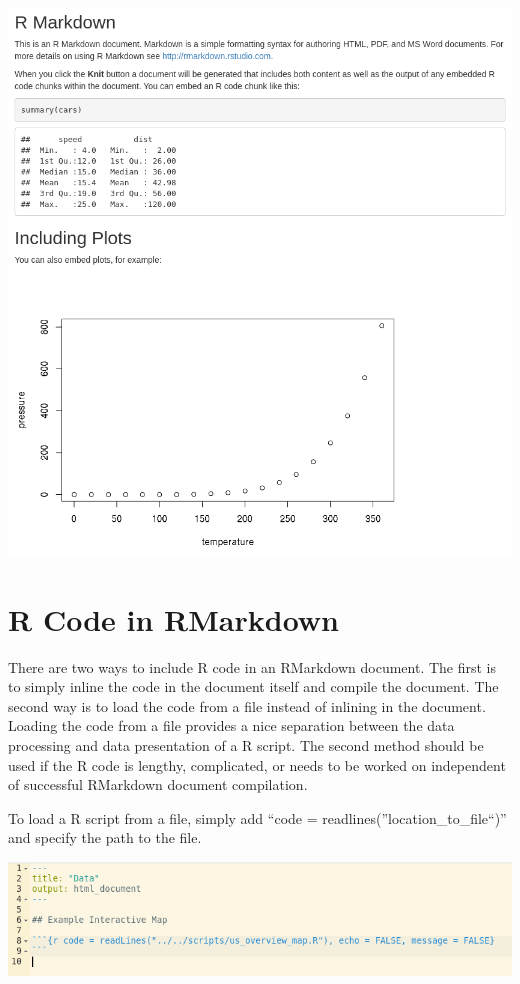 \documentclass[
]{book}
\begin{document}
\includegraphics{images/03-rmarkdown_2.png}

\hypertarget{r-code-in-rmarkdown}{%
\section{R Code in RMarkdown}\label{r-code-in-rmarkdown}}

There are two ways to include R code in an RMarkdown document. The first is to simply inline the code in the document itself and compile the document. The second way is to load the code from a file instead of inlining in the document. Loading the code from a file provides a nice separation between the data processing and data presentation of a R script. The second method should be used if the R code is lengthy, complicated, or needs to be worked on independent of successful RMarkdown document compilation.

To load a R script from a file, simply add ``code = readlines(''location\_to\_file``)'' and specify the path to the file.

\includegraphics{images/04-example2_3.png}
\end{document}
